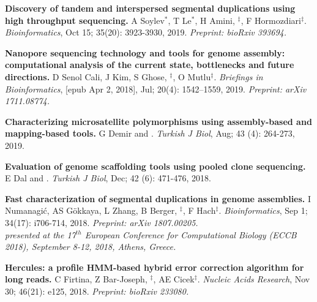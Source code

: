\vspace{-.2cm}
 {\bf Discovery of tandem and interspersed segmental duplications using high throughput sequencing.}
 A Soylev$^*$, T Le$^*$, H Amini, \calkan{}$^\ddag$, F Hormozdiari$^\ddag$.
{\em Bioinformatics}, Oct 15; 35(20): 3923-3930, 2019. \textit{Preprint: bioRxiv 393694.}


        
        
\vspace{-.2cm}

         {\bf Nanopore sequencing technology and tools for genome assembly: computational analysis of the current state, bottlenecks and future directions.}
         D Senol Cali, J Kim, S Ghose, \calkan{}$^\ddag$, O Mutlu$^\ddag$.
         {\em Briefings in Bioinformatics}, [epub Apr 2, 2018], Jul; 20(4): 1542–1559, 2019. \textit{Preprint: arXiv 1711.08774.}

\vspace{-.2cm}
         {\bf Characterizing microsatellite polymorphisms using assembly-based and mapping-based tools.}  G Demir and \calkan{}. {\em Turkish J Biol}, Aug; 43 (4): 264-273, 2019.


         \vspace{-.2cm}
         {\bf Evaluation of genome scaffolding tools using pooled clone sequencing.}  E Dal and \calkan{}. {\em Turkish J Biol}, Dec; 42 (6): 471-476, 2018.
         
         \vspace{-.2cm}

         {\bf Fast characterization of segmental duplications in genome assemblies.}
         I Numanagić,  AS Gökkaya, L Zhang, B Berger, \calkan{}$^\ddag$, F Hach$^\ddag$.
         {\em Bioinformatics}, Sep 1; 34(17): i706-714, 2018. \textit{Preprint: arXiv 1807.00205.}\\
         \hspace*{1cm}
          {\footnotesize \em presented at the 17$^{th}$ European Conference for Computational Biology (ECCB 2018), September 8-12, 2018, Athens, Greece.}

\vspace{-.2cm}
                {\bf Hercules: a profile HMM-based hybrid error correction algorithm for long reads.}
                C Firtina, Z Bar-Joseph, \calkan{}$^\ddag$, AE Cicek$^\ddag$.
                {\it Nucleic Acids Research}, Nov 30; 46(21): e125, 2018. \textit{Preprint: bioRxiv 233080.}

          
         \vspace{-.2cm}

